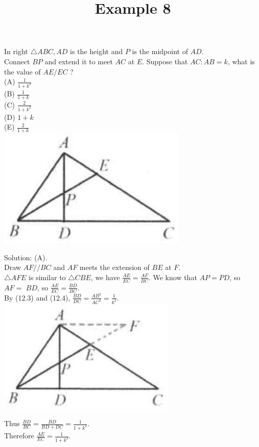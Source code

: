 \documentclass{article}
\title{Example 8}
\date{}
\begin{document}
\maketitle

In right \(\triangle A B C, A D\) is the height and \(P\) is the midpoint of \(A D\).\\
Connect \(B P\) and extend it to meet \(A C\) at \(E\). Suppose that \(A C: A B=k\), what is the value of \(A E / E C\) ?\\
(A) \(\frac{1}{1+k^{2}}\)\\
(B) \(\frac{1}{1+k}\)\\
(C) \(\frac{2}{1+k^{2}}\)\\
(D) \(1+k\)\\
(E) \(\frac{2}{1+k}\)\\
\centering
\includegraphics[width=\textwidth]{images/problem_image_1.jpg}

Solution: (A).\\
Draw \(A F / / B C\) and \(A F\) meets the extension of \(B E\) at \(F\).\\
\(\triangle A F E\) is similar to \(\triangle C B E\), we have \(\frac{A E}{E C}=\frac{A F}{B C}\). We know that \(A P=P D\), so \(A F=\) \(B D\), so \(\frac{A E}{E C}=\frac{B D}{B C}\).\\
By (12.3) and (12.4), \(\frac{B D}{D C}=\frac{A B^{2}}{A C^{2}}=\frac{1}{k^{2}}\).\\
\centering
\includegraphics[width=\textwidth]{images/reasoning_image_1.jpg}

Thus \(\frac{B D}{B C}=\frac{B D}{B D+D C}=\frac{1}{1+k^{2}}\).\\
Therefore \(\frac{A E}{E C}=\frac{1}{1+k^{2}}\).
\end{document}
